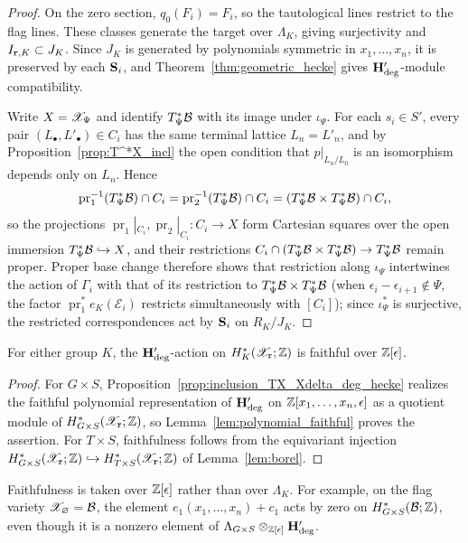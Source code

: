\begin{proof}
On the zero section, $q_0(F_i)=F_i$, so the tautological lines restrict to the flag lines.
These classes generate the target over $\Lambda_K$, giving surjectivity
and $I_{\mathtt r,K}\subset J_K$. Since $J_K$ is generated by polynomials symmetric in $x_1,\dots,x_n$,
it is preserved by each $\mathbf S_i$, and Theorem~\ref{thm:geometric_hecke}
gives $\mathbf H_{\mathrm{deg}}'$-module compatibility.

Write $X=\mathscr X_\Psi$ and identify $T^*_\Psi\mathcal B$ with its image under $\iota_\Psi$.
For each $s_i\in S'$, every pair $(L_\bullet,L'_\bullet)\in C_i$ has the same terminal lattice $L_n=L'_n$,
and by Proposition~\ref{prop:T^*X_incl} the open condition that $p|_{L_n/L_0}$ is an isomorphism
depends only on $L_n$.
Hence
\[
 \operatorname{pr}_1^{-1}(T^*_\Psi\mathcal B)\cap C_i
 =\operatorname{pr}_2^{-1}(T^*_\Psi\mathcal B)\cap C_i
 =(T^*_\Psi\mathcal B\times T^*_\Psi\mathcal B)\cap C_i,
\]
so the projections $\operatorname{pr}_1|_{C_i},\operatorname{pr}_2|_{C_i}:C_i\to X$ form Cartesian squares over the open immersion $T^*_\Psi\mathcal B\hookrightarrow X$, and their restrictions $C_i\cap(T^*_\Psi\mathcal B\times T^*_\Psi\mathcal B)\to T^*_\Psi\mathcal B$ remain proper.
Proper base change therefore shows that restriction along $\iota_\Psi$ intertwines the action of $\Gamma_i$ with that of its restriction to $T^*_\Psi\mathcal B\times T^*_\Psi\mathcal B$ (when $\epsilon_i-\epsilon_{i+1}\notin\Psi$, the factor $\operatorname{pr}_1^*e_K(\mathcal E_i)$ restricts simultaneously with $[C_i]$); since $\iota_\Psi^*$ is surjective, the restricted correspondences act by $\mathbf S_i$ on $R_K/J_K$.
\end{proof}

\begin{corollary}\label{cor:faithful_hecke}
For either group $K$, the $\mathbf H_{\mathrm{deg}}'$-action on $H_K^*(\mathscr X_{\mathtt r};\mathbb Z)$ is faithful over $\mathbb Z[\epsilon]$.
\end{corollary}

\begin{proof}
For $G\times S$, Proposition~\ref{prop:inclusion_TX_Xdelta_deg_hecke} realizes the faithful polynomial
representation of $\mathbf H_{\mathrm{deg}}'$ on $\mathbb Z[x_1,\dots,x_n,\epsilon]$ as a quotient module of $H_{G\times S}^*(\mathscr X_{\mathtt r};\mathbb Z)$, so Lemma~\ref{lem:polynomial_faithful} proves
the assertion. For $T\times S$, faithfulness follows from the equivariant injection
$H_{G\times S}^*(\mathscr X_{\mathtt r};\mathbb Z)\hookrightarrow H_{T\times S}^*(\mathscr X_{\mathtt r};\mathbb Z)$
of Lemma~\ref{lem:borel}.
\end{proof}

\begin{remark}
Faithfulness is taken over $\mathbb Z[\epsilon]$ rather than over $\Lambda_K$. For example, on the flag variety $\mathscr X_\varnothing=\mathcal B$, the element $e_1(x_1,\dots,x_n)+c_1$ acts by zero on
$H_{G\times S}^*(\mathcal B;\mathbb Z)$, even though it is a nonzero element of $\Lambda_{G\times S}\otimes_{\mathbb Z[\epsilon]}\mathbf H_{\mathrm{deg}}'$.
\end{remark}

